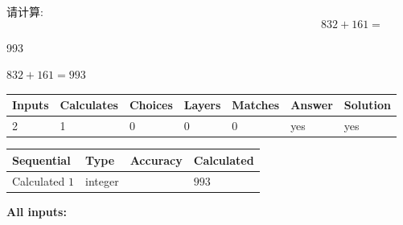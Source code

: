 \documentclass{ctexart}
\begin{document}
请计算:
\begin{equation}
832 +  %
161 = \nonumber
\end{equation}
 
 
 
\noindent{}
 
 

993
 
 
\noindent{}
 
 

 
 
 
\noindent{}
 
 

$ %
832 +  %
161=   %
993$
 
 
\noindent{}
 
 

 
   
   
   
   
\noindent\begin{tabular}{|l|l|l|l|l|l|l|}
 \hline
Inputs & Calculates & Choices & Layers & Matches & Answer & Solution \\ \hline
 2  & 
 1  & 
 0
  & 
 0  & 
 0  & 
  yes & 
  yes 
  \\ \hline
 \end{tabular}
   
   
   
   
\noindent{}
   
   
  
  
\noindent\begin{tabular}{|l|l|l|l|}
\hline
 Sequential & Type & Accuracy & Calculated \\ 
\hline
 
 
  Calculated $  1 $ & integer &  & 
  $ 993 $ 
 \\  \hline  
 \end{tabular}
   
   
   
   
\noindent\vspace{0.1in}\hspace{-0.08in} {\textbf{\Large{All inputs: }}}
   
   
  
\end{document}

